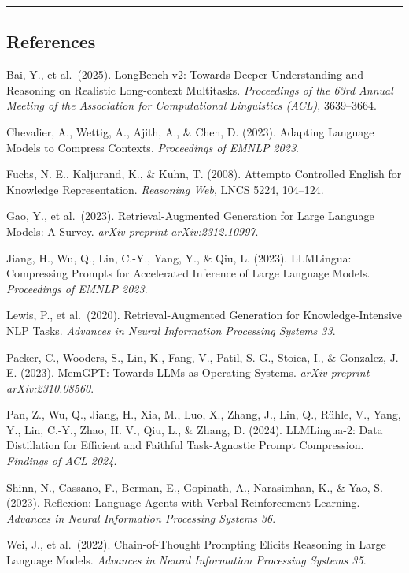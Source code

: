 \documentclass[
]{article}
\begin{document}
\begin{center}\rule{0.5\linewidth}{0.5pt}\end{center}

\subsection{References}\label{references}

Bai, Y., et al.~(2025). LongBench v2: Towards Deeper Understanding and
Reasoning on Realistic Long-context Multitasks. \emph{Proceedings of the
63rd Annual Meeting of the Association for Computational Linguistics
(ACL)}, 3639--3664.

Chevalier, A., Wettig, A., Ajith, A., \& Chen, D. (2023). Adapting
Language Models to Compress Contexts. \emph{Proceedings of EMNLP 2023}.

Fuchs, N. E., Kaljurand, K., \& Kuhn, T. (2008). Attempto Controlled
English for Knowledge Representation. \emph{Reasoning Web}, LNCS 5224,
104--124.

Gao, Y., et al.~(2023). Retrieval-Augmented Generation for Large
Language Models: A Survey. \emph{arXiv preprint arXiv:2312.10997}.

Jiang, H., Wu, Q., Lin, C.-Y., Yang, Y., \& Qiu, L. (2023). LLMLingua:
Compressing Prompts for Accelerated Inference of Large Language Models.
\emph{Proceedings of EMNLP 2023}.

Lewis, P., et al.~(2020). Retrieval-Augmented Generation for
Knowledge-Intensive NLP Tasks. \emph{Advances in Neural Information
Processing Systems 33}.

Packer, C., Wooders, S., Lin, K., Fang, V., Patil, S. G., Stoica, I., \&
Gonzalez, J. E. (2023). MemGPT: Towards LLMs as Operating Systems.
\emph{arXiv preprint arXiv:2310.08560}.

Pan, Z., Wu, Q., Jiang, H., Xia, M., Luo, X., Zhang, J., Lin, Q., Rühle,
V., Yang, Y., Lin, C.-Y., Zhao, H. V., Qiu, L., \& Zhang, D. (2024).
LLMLingua-2: Data Distillation for Efficient and Faithful Task-Agnostic
Prompt Compression. \emph{Findings of ACL 2024}.

Shinn, N., Cassano, F., Berman, E., Gopinath, A., Narasimhan, K., \&
Yao, S. (2023). Reflexion: Language Agents with Verbal Reinforcement
Learning. \emph{Advances in Neural Information Processing Systems 36}.

Wei, J., et al.~(2022). Chain-of-Thought Prompting Elicits Reasoning in
Large Language Models. \emph{Advances in Neural Information Processing
Systems 35}.
\end{document}
